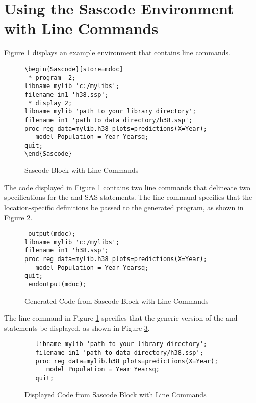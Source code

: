 \documentclass[article,oneside]{memoir}
\begin{document}
\section{Using the Sascode Environment with Line Commands}\label{scexlc}
Figure \ref{sblc} displays an example
   environment that contains line commands.
  
\begin{figure}[H]
\begin{snugshade}
\begin{verbatim} 
\begin{Sascode}[store=mdoc]
 * program  2;
libname mylib 'c:/mylibs';
filename in1 'h38.ssp';
 * display 2;
libname mylib 'path to your library directory';
filename in1 'path to data directory/h38.ssp';
proc reg data=mylib.h38 plots=predictions(X=Year);
   model Population = Year Yearsq;
quit;
\end{Sascode}
\end{verbatim}
\end{snugshade}
\caption{Sascode Block with Line Commands}\label{sblc}
\end{figure}
  The code displayed in Figure \ref{sblc} contains
  two line commands that delineate two
  specifications for the  and  SAS statements. 
  The line command  specifies that the location-specific 
  definitions be passed to the generated program,
   as shown in Figure \ref{fig:gsblc}. 
\begin{figure}[H]
\begin{snugshade}
\begin{verbatim} 
 output(mdoc);
libname mylib 'c:/mylibs';
filename in1 'h38.ssp';
proc reg data=mylib.h38 plots=predictions(X=Year);
   model Population = Year Yearsq;
quit;
 endoutput(mdoc);
\end{verbatim}
\end{snugshade}
\caption{Generated Code from Sascode Block with Line Commands}\label{fig:gsblc}
\end{figure}
  
  The line command  in Figure \ref{sblc} 
  specifies that the generic version
  of the  and  statements be displayed,
  as shown in Figure \ref{dsblc}. 
\begin{figure}[H]
\begin{snugshade}
\begin{verbatim} 
   libname mylib 'path to your library directory';
   filename in1 'path to data directory/h38.ssp';
   proc reg data=mylib.h38 plots=predictions(X=Year);
      model Population = Year Yearsq;
   quit;
\end{verbatim}
\end{snugshade}
\caption{Displayed Code from Sascode Block with Line Commands}\label{dsblc}
\end{figure}
\end{document}
